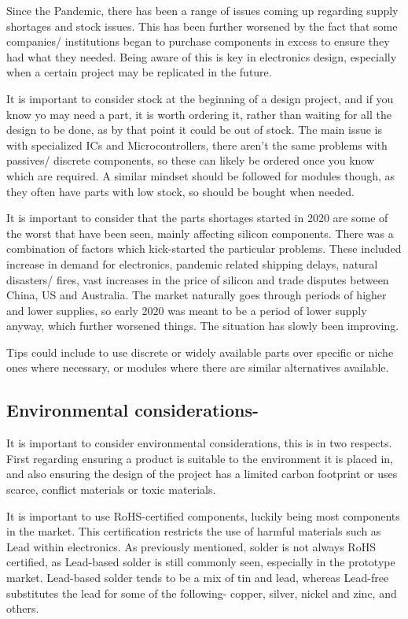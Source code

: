\documentclass[a4paper,11pt]{report}
\begin{document}
Since the Pandemic, there has been a range of issues coming up regarding supply shortages and stock issues. This has been further worsened by the fact that some companies/ institutions began to purchase components in excess to ensure they had what they needed. Being aware of this is key in electronics design, especially when a certain project may be replicated in the future.

It is important to consider stock at the beginning of a design project, and if you know yo may need a part, it is worth ordering it, rather than waiting for all the design to be done, as by that point it could be out of stock. The main issue is with specialized ICs and Microcontrollers, there aren't the same problems with passives/ discrete components, so these can likely be ordered once you know which are required. A similar mindset should be followed for modules though, as they often have parts with low stock, so should be bought when needed.

It is important to consider that the parts shortages started in 2020 are some of the worst that have been seen, mainly affecting silicon components. There was a combination of factors which kick-started the particular problems. These included increase in demand for electronics, pandemic related shipping delays, natural disasters/ fires, vast increases in the price of silicon and trade disputes between China, US and Australia. The market naturally goes through periods of higher and lower supplies, so early 2020 was meant to be a period of lower supply anyway, which further worsened things. The situation has slowly been improving.

Tips could include to use discrete or widely available parts over specific or niche ones where necessary, or modules where there are similar alternatives available.


\subsection{Environmental considerations-}
It is important to consider environmental considerations, this is in two respects. First regarding ensuring a product is suitable to the environment it is placed in, and also ensuring the design of the project has a limited carbon footprint or uses scarce, conflict materials or toxic materials.

It is important to use RoHS-certified components, luckily being most components in the market. This certification restricts the use of harmful materials such as Lead within electronics. As previously mentioned, solder is not always RoHS certified, as Lead-based solder is still commonly seen, especially in the prototype market. Lead-based solder tends to be a mix of tin and lead, whereas Lead-free substitutes the lead for some of the following- copper, silver, nickel and zinc, and others.
\end{document}
